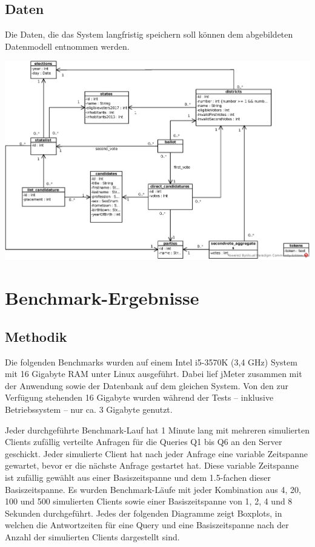\documentclass[a4paper]{scrreprt}
\begin{document}
\section{Daten}
Die Daten, die das System langfristig speichern soll können dem abgebildeten Datenmodell entnommen werden.

\noindent\includegraphics[width=\textwidth]{images/DBS_Schema.eps}




\appendix
\chapter{Benchmark-Ergebnisse}\label{apx:bench}

\section{Methodik}

Die folgenden Benchmarks wurden auf einem Intel i5-3570K (3,4 GHz) System mit 16 Gigabyte RAM unter Linux ausgeführt.
Dabei lief jMeter zusammen mit der Anwendung sowie der Datenbank auf dem gleichen System.
Von den zur Verfügung stehenden 16 Gigabyte wurden während der Tests -- inklusive Betriebssystem -- nur ca. 3 Gigabyte genutzt.

Jeder durchgeführte Benchmark-Lauf hat 1 Minute lang mit mehreren simulierten Clients zufällig verteilte Anfragen für die Queries Q1 bis Q6 an den Server geschickt.
Jeder simulierte Client hat nach jeder Anfrage eine variable Zeitspanne gewartet, bevor er die nächste Anfrage gestartet hat.
Diese variable Zeitspanne ist zufällig gewählt aus einer Basiszeitspanne und dem 1.5-fachen dieser Basiszeitspanne.
Es wurden Benchmark-Läufe mit jeder Kombination aus 4, 20, 100 und 500 simulierten Clients sowie einer Basiszeitspanne von 1, 2, 4 und 8 Sekunden durchgeführt.
Jedes der folgenden Diagramme zeigt Boxplots, in welchen die Antwortzeiten für eine Query und eine Basiszeitspanne nach der Anzahl der simulierten Clients dargestellt sind.
\end{document}
